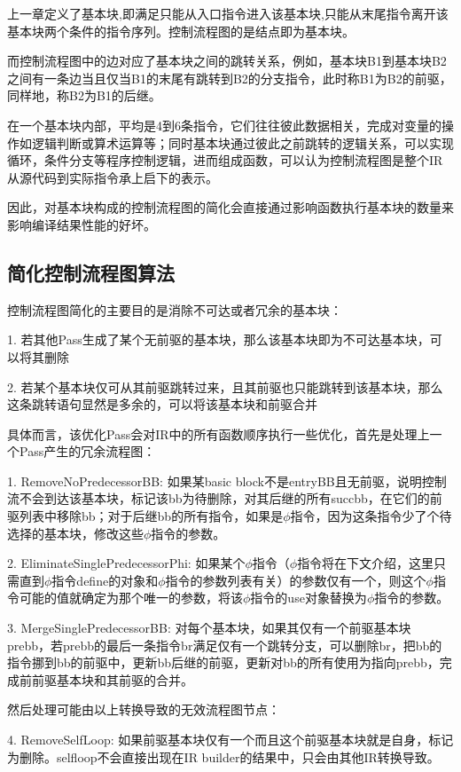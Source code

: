 上一章定义了基本块,即满足只能从入口指令进入该基本块,只能从末尾指令离开该基本块两个条件的指令序列。控制流程图的是结点即为基本块。

而控制流程图中的边对应了基本块之间的跳转关系，例如，基本块B1到基本块B2之间有一条边当且仅当B1的末尾有跳转到B2的分支指令，此时称B1为B2的前驱，同样地，称B2为B1的后继。

在一个基本块内部，平均是4到6条指令，它们往往彼此数据相关，完成对变量的操作如逻辑判断或算术运算等；同时基本块通过彼此之前跳转的逻辑关系，可以实现循环，条件分支等程序控制逻辑，进而组成函数，可以认为控制流程图是整个IR从源代码到实际指令承上启下的表示。

因此，对基本块构成的控制流程图的简化会直接通过影响函数执行基本块的数量来影响编译结果性能的好坏。

\subsection{简化控制流程图算法}

控制流程图简化的主要目的是消除不可达或者冗余的基本块：

1. 若其他Pass生成了某个无前驱的基本块，那么该基本块即为不可达基本块，可以将其删除

2. 若某个基本块仅可从其前驱跳转过来，且其前驱也只能跳转到该基本块，那么这条跳转语句显然是多余的，可以将该基本块和前驱合并

具体而言，该优化Pass会对IR中的所有函数顺序执行一些优化，首先是处理上一个Pass产生的冗余流程图：

1.  RemoveNoPredecessorBB: 如果某basic block不是entryBB且无前驱，说明控制流不会到达该基本块，标记该bb为待删除，对其后继的所有succbb，在它们的前驱列表中移除bb；对于后继bb的所有指令，如果是$\phi$指令，因为这条指令少了个待选择的基本块，修改这些$\phi$指令的参数。

2. EliminateSinglePredecessorPhi: 如果某个$\phi$指令（$\phi$指令将在下文介绍，这里只需直到$\phi$指令define的对象和$\phi$指令的参数列表有关）的参数仅有一个，则这个$\phi$指令可能的值就确定为那个唯一的参数，将该$\phi$指令的use对象替换为$\phi$指令的参数。

3. MergeSinglePredecessorBB: 对每个基本块，如果其仅有一个前驱基本块prebb，若prebb的最后一条指令br满足仅有一个跳转分支，可以删除br，把bb的指令挪到bb的前驱中，更新bb后继的前驱，更新对bb的所有使用为指向prebb，完成前前驱基本块和其前驱的合并。

然后处理可能由以上转换导致的无效流程图节点：

4. RemoveSelfLoop: 如果前驱基本块仅有一个而且这个前驱基本块就是自身，标记为删除。selfloop不会直接出现在IR builder的结果中，只会由其他IR转换导致。

